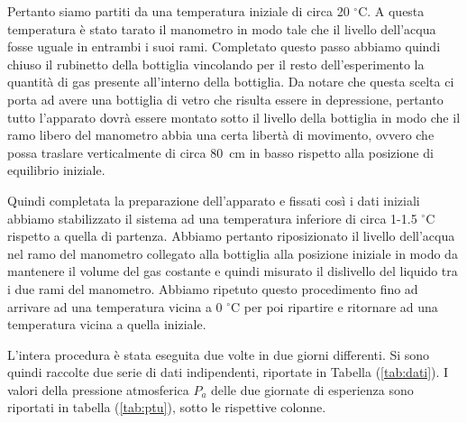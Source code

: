 Pertanto siamo partiti da una temperatura iniziale di circa 20 $^\circ$C. A questa temperatura è stato tarato il manometro in modo tale che il livello dell'acqua fosse uguale in entrambi i suoi rami. Completato questo passo abbiamo quindi chiuso il rubinetto della bottiglia vincolando per il resto dell'esperimento la quantità di gas presente all'interno della bottiglia. Da notare che questa scelta ci porta ad avere una bottiglia di vetro che risulta essere in depressione, pertanto tutto l'apparato dovrà essere montato sotto il livello della bottiglia in modo che il ramo libero del manometro abbia una certa libertà di movimento, ovvero che possa traslare verticalmente di circa \SI{80}{\centi\metre} in basso rispetto alla posizione di equilibrio iniziale.

Quindi completata la preparazione dell'apparato e fissati così i dati iniziali abbiamo stabilizzato il sistema ad una temperatura inferiore di circa 1-1.5 $^\circ$C rispetto a quella di partenza. Abbiamo pertanto riposizionato il livello dell'acqua nel ramo del manometro collegato alla bottiglia alla posizione iniziale in modo da mantenere il volume del gas costante e quindi misurato il dislivello del liquido tra i due rami del manometro.
Abbiamo ripetuto questo procedimento fino ad arrivare ad una temperatura vicina a 0 $^\circ$C per poi ripartire e ritornare ad una temperatura vicina a quella iniziale.

L'intera procedura è stata eseguita due volte in due giorni differenti. Si sono quindi raccolte due serie di dati indipendenti, riportate
in Tabella (\ref{tab:dati}). I valori della pressione atmosferica $P_a$ delle due giornate di esperienza sono
riportati in tabella (\ref{tab:ptu}), sotto le rispettive colonne.


